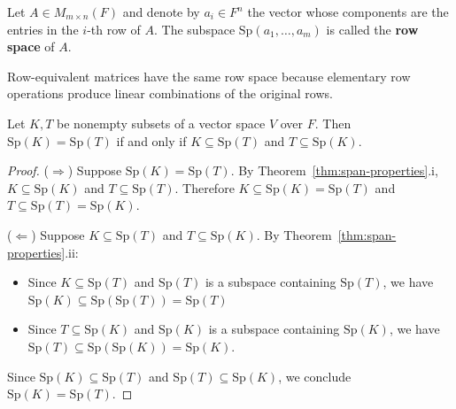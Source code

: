 \begin{definition*}\label{def:row-space}
    Let $A \in M_{m \times n}(F)$ and denote by $a_i \in F^n$ the vector whose components are the entries in the $i$-th row of $A$. The subspace $\mathrm{Sp}(a_1, \ldots, a_m)$ is called the \textbf{row space} of $A$.
\end{definition*}

\begin{note}
    Row-equivalent matrices have the same row space because elementary row operations produce linear combinations of the original rows.
\end{note}

\begin{theorem}\label{thm:span-equality}
    Let $K, T$ be nonempty subsets of a vector space $V$ over $F$. Then $\mathrm{Sp}(K) = \mathrm{Sp}(T)$ if and only if $K \subseteq \mathrm{Sp}(T)$ and $T \subseteq \mathrm{Sp}(K)$.
\end{theorem}

\begin{proof}
    ($\Rightarrow$) Suppose $\mathrm{Sp}(K) = \mathrm{Sp}(T)$. By Theorem~\ref{thm:span-properties}.i, $K \subseteq \mathrm{Sp}(K)$ and $T \subseteq \mathrm{Sp}(T)$. Therefore $K \subseteq \mathrm{Sp}(K) = \mathrm{Sp}(T)$ and $T \subseteq \mathrm{Sp}(T) = \mathrm{Sp}(K)$.
    
    ($\Leftarrow$) Suppose $K \subseteq \mathrm{Sp}(T)$ and $T \subseteq \mathrm{Sp}(K)$. By Theorem~\ref{thm:span-properties}.ii:
    \begin{itemize}
        \item Since $K \subseteq \mathrm{Sp}(T)$ and $\mathrm{Sp}(T)$ is a subspace containing $\mathrm{Sp}(T)$, we have $\mathrm{Sp}(K) \subseteq \mathrm{Sp}(\mathrm{Sp}(T)) = \mathrm{Sp}(T)$
        \item Since $T \subseteq \mathrm{Sp}(K)$ and $\mathrm{Sp}(K)$ is a subspace containing $\mathrm{Sp}(K)$, we have $\mathrm{Sp}(T) \subseteq \mathrm{Sp}(\mathrm{Sp}(K)) = \mathrm{Sp}(K)$.
    \end{itemize}
    Since $\mathrm{Sp}(K) \subseteq \mathrm{Sp}(T)$ and $\mathrm{Sp}(T) \subseteq \mathrm{Sp}(K)$, we conclude $\mathrm{Sp}(K) = \mathrm{Sp}(T)$.
\end{proof}